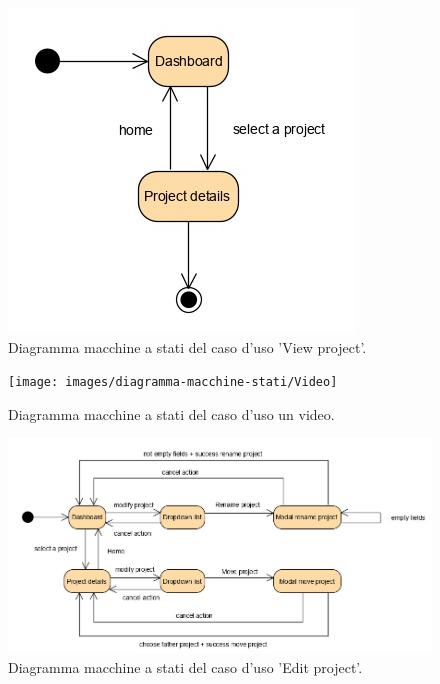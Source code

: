\begin{figure}[H]
	\centering
	\caption{Diagramma macchine a stati del caso d'uso 'View project'.}
	\label{fig:diagramma-macchine-stati:view-project}
	\includegraphics[width=\textwidth]{images/diagramma-macchine-stati/view-project}
\end{figure}

\begin{figure}[H]
	\centering
	\caption{Diagramma macchine a stati del caso d'uso un video.}
	\label{fig:diagramma-macchine-stati:video}
	\texttt{[image: images/diagramma-macchine-stati/Video]}
\end{figure}

\begin{figure}[H]
	\centering
	\caption{Diagramma macchine a stati del caso d'uso 'Edit project'.}
	\label{fig:diagramma-macchine-stati:edit-project}
	\includegraphics[width=\textwidth]{images/diagramma-macchine-stati/edit-project}
\end{figure}

